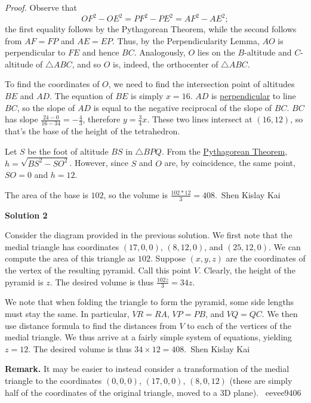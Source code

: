 \begin{enumerate}
 \textit{Proof.} Observe that 
 \[OF^2 - OE^2 = PF^2 - PE^2 = AF^2 - AE^2;\] the first equality follows by the Pythagorean Theorem, while the second follows from $AF = FP$ and $AE = EP$.  Thus, by the Perpendicularity Lemma, $AO$ is perpendicular to $FE$ and hence $BC$.  Analogously, $O$ lies on the $B$-altitude and $C$-altitude of $\triangle ABC$, and so $O$ is, indeed, the orthocenter of $\triangle ABC$.

 To find the coordinates of $O$, we need to find the intersection point of altitudes $BE$ and $AD$. The equation of $BE$ is simply $x=16$. $AD$ is \href{https://artofproblemsolving.com/wiki/index.php?title=Perpendicular}{perpendicular} to line $BC$, so the slope of $AD$ is equal to the negative reciprocal of the slope of $BC$. $BC$ has slope $\frac{24-0}{16-34}=-\frac{4}{3}$, therefore $y=\frac{3}{4} x$. These two lines intersect at $(16,12)$, so that's the base of the height of the tetrahedron. 

 Let $S$ be the foot of altitude $BS$ in $\triangle BPQ$. From the \href{https://artofproblemsolving.com/wiki/index.php?title=Pythagorean\_Theorem}{Pythagorean Theorem}, $h=\sqrt{BS^2-SO^2}$. However, since $S$ and $O$ are, by coincidence, the same point, $SO=0$ and $h=12$.

 The area of the base is $102$, so the volume is $\frac{102*12}{3}=\boxed{408}$.~Shen Kislay Kai

 



\textbf{Solution 2}

Consider the diagram provided in the previous solution. We first note that the medial triangle has coordinates $(17, 0, 0)$, $(8, 12, 0)$, and $(25, 12, 0)$. We can compute the area of this triangle as $102$. Suppose $(x, y, z)$ are the coordinates of the vertex of the resulting pyramid. Call this point $V$. Clearly, the height of the pyramid is $z$. The desired volume is thus $\frac{102z}{3} = 34z$. 

 We note that when folding the triangle to form the pyramid, some side lengths must stay the same. In particular, $VR = RA$, $VP = PB$, and $VQ = QC$. We then use distance formula to find the distances from $V$ to each of the vertices of the medial triangle. We thus arrive at a fairly simple system of equations, yielding $z = 12$. The desired volume is thus $34 \times 12 = \boxed{408}$.~Shen Kislay Kai

 
\textbf{Remark.} It may be easier to instead consider a transformation of the medial triangle to the coordinates $(0,0,0)$, $(17,0,0)$, $(8,0,12)$ (these are simply half of the coordinates of the original triangle, moved to a 3D plane). ~eevee9406


\end{enumerate}
